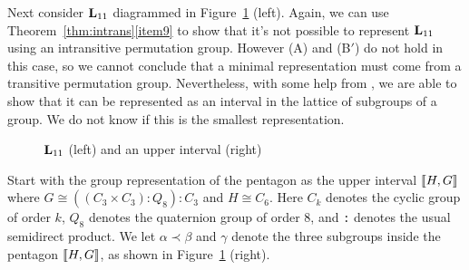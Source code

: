 

Next consider $\mathbf{L}_{11}$ diagrammed in Figure~\ref{fig:L11} (left). Again, we
can use Theorem~\ref{thm:intrans}\eqref{item9} to show that it's not possible to
represent $\mathbf{L}_{11}$ using an intransitive permutation group. However (A) and
(B$'$) do not hold in this case, so we cannot conclude that a minimal representation
must come from a transitive permutation group. Nevertheless, with some help from
\gap, we are able to show that it can be represented as an interval
in the lattice of subgroups of a group. We do not know if this is the
smallest representation.


\begin{figure}[htb]
\begin{center}
  \hskip1cm
\end{center}
\caption{$\mathbf{L}_{11}$ (left) and an upper interval (right)}\label{fig:L11}
\end{figure}
Start with the group representation of the pentagon as the upper
interval $\llbracket H, G\rrbracket$ where $G \cong ((C_3 \times C_3) : Q_8) : C_3$ and 
$H \cong C_6$.
Here $C_k$ denotes the cyclic group of order $k$, $Q_8$ denotes the
quaternion group of order 8, and {\tt :} denotes the usual semidirect product.
We let $\alpha \prec \beta$ and $\gamma$ denote the three subgroups inside the
pentagon $\llbracket H, G \rrbracket$, as shown in Figure~\ref{fig:L11} (right).

